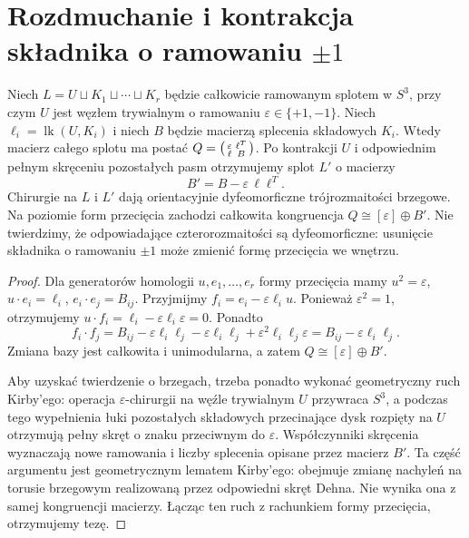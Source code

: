\section{Rozdmuchanie i kontrakcja składnika o ramowaniu \texorpdfstring{$\pm1$}{+/-1}}
\label{sec:tg-kirby-blowdown}

\begin{twierdzenie}
\label{thm:tg-kirby-blowdown}
Niech $L=U\sqcup K_1\sqcup\cdots\sqcup K_r$
będzie całkowicie ramowanym splotem w $S^3$,
przy czym $U$ jest węzłem trywialnym o ramowaniu
$\varepsilon\in\{+1,-1\}$.
Niech $\ell_i=\operatorname{lk}(U,K_i)$ i niech
$B$ będzie macierzą splecenia składowych $K_i$.
Wtedy macierz całego splotu ma postać
$Q=\begin{psmallmatrix}\varepsilon&\ell^T\\\ell&B\end{psmallmatrix}$.
Po kontrakcji $U$ i odpowiednim pełnym skręceniu
pozostałych pasm otrzymujemy splot $L'$ o macierzy
\[
B'=B-\varepsilon\,\ell\ell^T.
\]
Chirurgie na $L$ i $L'$ dają orientacyjnie dyfeomorficzne
trójrozmaitości brzegowe. Na poziomie form przecięcia
zachodzi całkowita kongruencja
$Q\cong[\varepsilon]\oplus B'$.
Nie twierdzimy, że odpowiadające czterorozmaitości
są dyfeomorficzne: usunięcie składnika o ramowaniu
$\pm1$ może zmienić formę przecięcia we wnętrzu.
\end{twierdzenie}

\begin{proof}
Dla generatorów homologii $u,e_1,\ldots,e_r$
formy przecięcia mamy $u^2=\varepsilon$,
$u\cdot e_i=\ell_i$, $e_i\cdot e_j=B_{ij}$.
Przyjmijmy
$f_i=e_i-\varepsilon\ell_i u$. Ponieważ
$\varepsilon^2=1$, otrzymujemy
$u\cdot f_i=\ell_i-\varepsilon\ell_i\varepsilon=0$.
Ponadto
\[
f_i\cdot f_j=B_{ij}
-\varepsilon\ell_i\ell_j
-\varepsilon\ell_i\ell_j
+\varepsilon^2\ell_i\ell_j\varepsilon
=B_{ij}-\varepsilon\ell_i\ell_j.
\]
Zmiana bazy jest całkowita i unimodularna,
a zatem $Q\cong[\varepsilon]\oplus B'$.

Aby uzyskać twierdzenie o brzegach, trzeba ponadto
wykonać geometryczny ruch Kirby'ego: operacja
$\varepsilon$-chirurgii na węźle trywialnym $U$
przywraca $S^3$, a podczas tego wypełnienia łuki
pozostałych składowych przecinające dysk rozpięty na $U$
otrzymują pełny skręt o znaku przeciwnym do $\varepsilon$.
Współczynniki skręcenia wyznaczają nowe ramowania
i liczby splecenia opisane przez macierz $B'$.
Ta część argumentu jest geometrycznym lematem Kirby'ego:
obejmuje zmianę nachyleń na torusie brzegowym
realizowaną przez odpowiedni skręt Dehna.
Nie wynika ona z samej kongruencji macierzy.
Łącząc ten ruch z rachunkiem formy przecięcia,
otrzymujemy tezę.
\end{proof}

